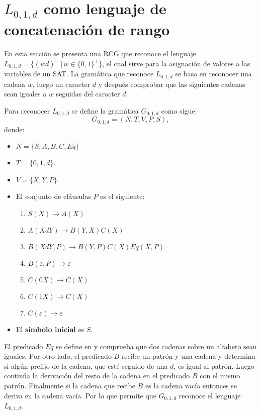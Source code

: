 \documentclass[12pt]{article}
\begin{document}
\section{$L_{0,1,d}$ como lenguaje de concatenación de rango}

En esta sección se presenta una RCG que reconoce el lenguaje $L_{0,1,d}=\{(wd)^+\,|\,w\in\{0,1\}^+\}$, el cual 
sirve para la asignación de valores a las variables de un SAT. La gramática que reconoce $L_{0,1,d}$ se basa 
en reconocer una cadena $w$, luego un caracter $d$ y después comprobar que las siguientes cadenas sean iguales 
a $w$ seguidas del caracter $d$.

Para reconocer $L_{0,1,d}$ se define la gramática $G_{0,1,d}$ como sigue:
\[
    G_{0,1,d} = (N, T, V, P, S),
\]
donde:

\begin{itemize}
    \item $N=\{S,A,B,C,Eq\}$
    \item $T=\{0,1,d\}$.
    \item $V=\{X,Y,P\}$.
    \item El conjunto de cláusulas $P$ es el siguiente:
          \begin{enumerate}
              \item $S(X)\to A(X)$
              \item $A(XdY)\to B(Y,X)C(X)$
              \item $B(XdY,P)\to B(Y,P) C(X) Eq(X,P)$
              \item $B(\varepsilon,P)\to \varepsilon$
              \item $C(0X)\to C(X)$
              \item $C(1X)\to C(X)$
              \item $C(\varepsilon)\to \varepsilon$
          \end{enumerate}
    \item El \textbf{símbolo inicial} es $S$.
\end{itemize}

El predicado $Eq$ se define en \cite{mainRCGBib} y comprueba que dos cadenas sobre un alfabeto sean iguales.  
Por otro lado, el predicado $B$ recibe un patrón y una cadena y determina si algún prefijo de la cadena, que 
esté seguido de una $d$, es igual al patrón. Luego continúa la derivación del resto de la cadena en el predicado 
$B$ con el mismo patrón. Finalmente si la cadena que recibe $B$ es 
la cadena vacía entonces se deriva en la cadena vacía. Por lo que permite que $G_{0,1,d}$ reconoce el lenguaje $L_{0,1,d}$.
\end{document}
